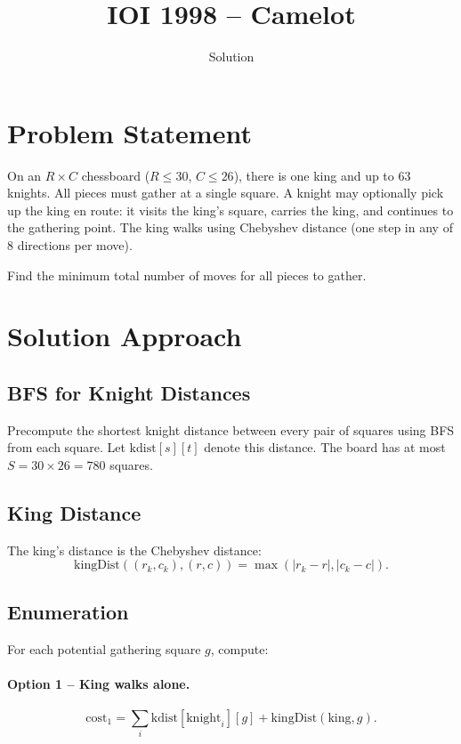 \documentclass[11pt,a4paper]{article}
\title{IOI 1998 -- Camelot}
\author{Solution}
\date{}
\begin{document}
\maketitle

\section{Problem Statement}

On an $R \times C$ chessboard ($R \le 30$, $C \le 26$), there is one king and
up to 63 knights. All pieces must gather at a single square. A knight may optionally
pick up the king en route: it visits the king's square, carries the king, and
continues to the gathering point. The king walks using Chebyshev distance (one step
in any of 8 directions per move).

Find the minimum total number of moves for all pieces to gather.

\section{Solution Approach}

\subsection{BFS for Knight Distances}

Precompute the shortest knight distance between every pair of squares using BFS from
each square. Let $\mathrm{kdist}[s][t]$ denote this distance. The board has at most
$S = 30 \times 26 = 780$ squares.

\subsection{King Distance}

The king's distance is the Chebyshev distance:
\[
  \mathrm{kingDist}((r_k, c_k), (r, c)) = \max(|r_k - r|, |c_k - c|).
\]

\subsection{Enumeration}

For each potential gathering square $g$, compute:

\paragraph{Option 1 -- King walks alone.}
\[
  \mathrm{cost}_1 = \sum_{i} \mathrm{kdist}[\mathrm{knight}_i][g] + \mathrm{kingDist}(\mathrm{king}, g).
\]
\end{document}
